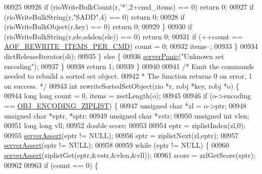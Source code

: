 \begin{DoxyCode}
{{{{{{{{{{{{{{{00925 
00926                 \textcolor{keywordflow}{if} (rioWriteBulkCount(r,\textcolor{stringliteral}{'*'},2+cmd\_items) == 0) \textcolor{keywordflow}{return} 0;
00927                 \textcolor{keywordflow}{if} (rioWriteBulkString(r,\textcolor{stringliteral}{"SADD"},4) == 0) \textcolor{keywordflow}{return} 0;
00928                 \textcolor{keywordflow}{if} (rioWriteBulkObject(r,key) == 0) \textcolor{keywordflow}{return} 0;
00929             \}
00930             \textcolor{keywordflow}{if} (rioWriteBulkString(r,ele,sdslen(ele)) == 0) \textcolor{keywordflow}{return} 0;
00931             \textcolor{keywordflow}{if} (++count == \hyperlink{server_8h_a437bda3214c8acb2835f49eb68919507}{AOF\_REWRITE\_ITEMS\_PER\_CMD}) count = 0;
00932             items--;
00933         \}
00934         dictReleaseIterator(di);
00935     \} \textcolor{keywordflow}{else} \{
00936         \hyperlink{server_8h_a11cc378e7778a830b41240578de3b204}{serverPanic}(\textcolor{stringliteral}{"Unknown set encoding"});
00937     \}
00938     \textcolor{keywordflow}{return} 1;
00939 \}
00940 
00941 \textcolor{comment}{/* Emit the commands needed to rebuild a sorted set object.}
00942 \textcolor{comment}{ * The function returns 0 on error, 1 on success. */}
00943 \textcolor{keywordtype}{int} rewriteSortedSetObject(rio *r, robj *key, robj *o) \{
00944     \textcolor{keywordtype}{long} \textcolor{keywordtype}{long} count = 0, items = zsetLength(o);
00945 
00946     \textcolor{keywordflow}{if} (o->encoding == \hyperlink{server_8h_aabf064ede983103f1fd0df2086e84eee}{OBJ\_ENCODING\_ZIPLIST}) \{
00947         \textcolor{keywordtype}{unsigned} \textcolor{keywordtype}{char} *zl = o->ptr;
00948         \textcolor{keywordtype}{unsigned} \textcolor{keywordtype}{char} *eptr, *sptr;
00949         \textcolor{keywordtype}{unsigned} \textcolor{keywordtype}{char} *vstr;
00950         \textcolor{keywordtype}{unsigned} \textcolor{keywordtype}{int} vlen;
00951         \textcolor{keywordtype}{long} \textcolor{keywordtype}{long} vll;
00952         \textcolor{keywordtype}{double} score;
00953 
00954         eptr = ziplistIndex(zl,0);
00955         \hyperlink{server_8h_a88114b5169b4c382df6b56506285e56a}{serverAssert}(eptr != NULL);
00956         sptr = ziplistNext(zl,eptr);
00957         \hyperlink{server_8h_a88114b5169b4c382df6b56506285e56a}{serverAssert}(sptr != NULL);
00958 
00959         \textcolor{keywordflow}{while} (eptr != NULL) \{
00960             \hyperlink{server_8h_a88114b5169b4c382df6b56506285e56a}{serverAssert}(ziplistGet(eptr,&vstr,&vlen,&vll));
00961             score = zzlGetScore(sptr);
00962 
00963             \textcolor{keywordflow}{if} (count == 0) \{
}}}}}}}}}}}}}}}
\end{DoxyCode}
